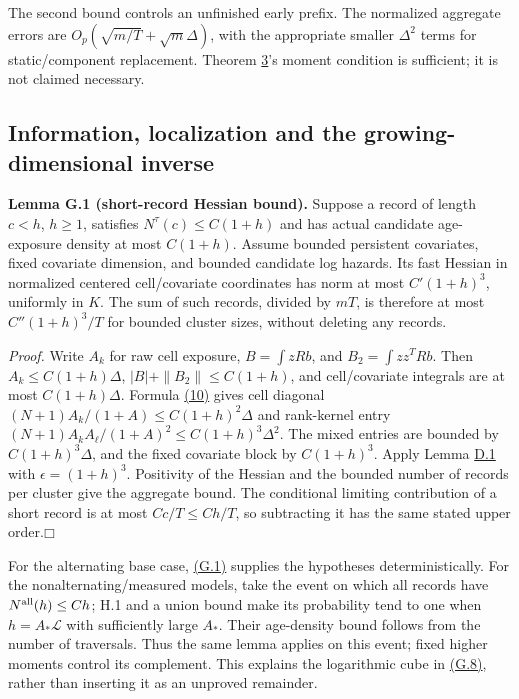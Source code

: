 \documentclass[11pt]{article}
\providecommand{\square}{\mdlgwhtsquare}
\begin{document}
The second bound controls an unfinished early prefix. The normalized aggregate errors are \(O_p(\sqrt{m/T}+\sqrt m\Delta)\), with the appropriate smaller \(\Delta^2\) terms for static/component replacement. Theorem \hyperref[res:Theorem-3]{3}'s moment condition is sufficient; it is not claimed necessary.

\subsection{Information, localization and the growing-dimensional inverse}\label{sec:G.4}

\label{res:Lemma-G.1}
\textbf{Lemma G.1 (short-record Hessian bound).} Suppose a record of length \(c<h\), \(h\ge1\), satisfies \(N^\tau(c)\le C(1+h)\) and has actual candidate age-exposure density at most \(C(1+h)\). Assume bounded persistent covariates, fixed covariate dimension, and bounded candidate log hazards. Its fast Hessian in normalized centered cell/covariate coordinates has norm at most \(C'(1+h)^3\), uniformly in \(K\). The sum of such records, divided by \(mT\), is therefore at most \(C''(1+h)^3/T\) for bounded cluster sizes, without deleting any records.

\emph{Proof.} Write \(A_k\) for raw cell exposure, \(B=\int zRb\), and \(B_2=\int zz^TRb\). Then
\(A_k\le C(1+h)\Delta\), \(|B|+\|B_2\|\le C(1+h)\), and cell/covariate integrals are at most \(C(1+h)\Delta\).
Formula \hyperref[eq:10]{(10)} gives cell diagonal
\((N+1)A_k/(1+A)\le C(1+h)^2\Delta\)
and rank-kernel entry
\((N+1)A_kA_\ell/(1+A)^2\le C(1+h)^3\Delta^2\).
The mixed entries are bounded by \(C(1+h)^3\Delta\), and the fixed covariate block by \(C(1+h)^3\). Apply Lemma \hyperref[res:Lemma-D.1]{D.1} with \(\epsilon=(1+h)^3\). Positivity of the Hessian and the bounded number of records per cluster give the aggregate bound. The conditional limiting contribution of a short record is at most \(Cc/T\le Ch/T\), so subtracting it has the same stated upper order.\hfill$\square$

For the alternating base case, \hyperref[eq:G.1]{(G.1)} supplies the hypotheses deterministically. For the nonalternating/measured models, take the event on which all records have \(N^{\rm all}(h)\le Ch\); H.1 and a union bound make its probability tend to one when \(h=A_*\mathscr L\) with sufficiently large \(A_*\). Their age-density bound follows from the number of traversals. Thus the same lemma applies on this event; fixed higher moments control its complement. This explains the logarithmic cube in \hyperref[eq:G.8]{(G.8)}, rather than inserting it as an unproved remainder.
\end{document}
